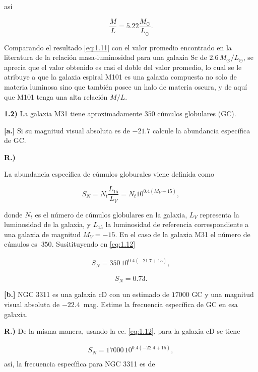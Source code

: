 \documentclass[paper=a4, fontsize=10pt]{scrartcl} %
\begin{document}
así

\begin{equation} \label{eq:1.11}
\frac{M}{L} = 5.22 \frac{M_{\odot}}{ L_{\odot}}.
\end{equation}

Comparando el resultado \eqref{eq:1.11} con el valor promedio  encontrado en la literatura de la relación masa-luminosidad para una galaxia Sc de $2.6 \, M_{\odot}/L_{\odot}$, se aprecia que el valor obtenido es casi el doble del valor promedio, lo cual se le atribuye a que la galaxia espiral M101 es una galaxia compuesta no solo de materia luminosa sino que también posee un halo de materia oscura, y de aquí que M101 tenga una alta relación $M/L$. 

 
{\bf{{1.2)}}} La galaxia M31 tiene aproximadamente $350$ cúmulos globulares (GC).



{\bf{[a.]}} Si su magnitud visual absoluta es de $-21.7$ calcule la abundancia específica de GC.

{\bf{R.)}}

La abundancia específica de cúmulos globurales viene definida como

\begin{equation} \label{eq:1.12} 
S_N = N_t \frac{L_{15}}{L_V} = N_t 10^{0.4(M_V +15)},
\end{equation}

donde $N_t$ es el número de cúmulos globulares en la galaxia, $L_V$ representa la luminosidad de la galaxia, y $L_{15}$ la luminosidad de referencia correspondiente a una galaxia de magnitud $M_V=-15$. En el caso de la galaxia M31 el número de cúmulos es $~350$. Susitituyendo en \eqref{eq:1.12}

\begin{align*}
S_N = 350 \, 10^{0.4(-21.7+15)},
\end{align*}

\begin{equation} \label{eq:1.13}
S_N = 0.73. 
\end{equation}



 {\bf{[b.]}} NGC 3311 es una galaxia cD con un estimado de $17000$ GC y una magnitud visual absoluta de $-22.4 \,$ mag. Estime la frecuencia específica de GC en esa galaxia.

{\bf{R.)}}  De la misma manera, usando la ec. \eqref{eq:1.12}, para la galaxia cD se tiene 


\begin{align*}
S_N = 17000 \, 10^{0.4(-22.4+15)}, \\
\end{align*}
 así, la frecuencia específica para NGC 3311 es de 
 
\end{document}
